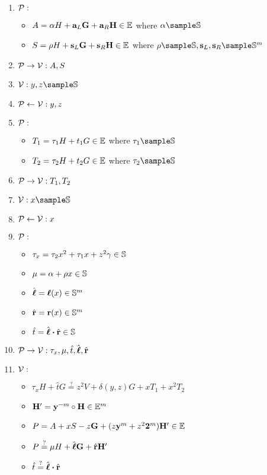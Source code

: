 \begin{enumerate}
    \item $\mathcal{P}:$
        \begin{itemize}
            \item $A = \alpha H + \mathbf{a}_L\mathbf{G} + \mathbf{a}_R\mathbf{H} \in \mathbb{E}$ where $\alpha \sample \scalars$
            \item $S = \rho H + \mathbf{s}_L\mathbf{G} + \mathbf{s}_R\mathbf{H} \in \mathbb{E}$
                where $\rho \sample \scalars, \vec{s}_L, \vec{s}_R \sample \scalars^m$
        \end{itemize}
    \item $\mathcal{P} \to \mathcal{V}: A, S$
    \item \hfill $\verifier: y, z \sample \scalars$
    \item \hfill $\mathcal{P} \leftarrow \mathcal{V}: y, z$
    \item $\mathcal{P}:$
        \begin{itemize}
            \item $T_1 = \tau_1 H + t_1G \in \mathbb{E}$ where $\tau_1 \sample \scalars$
            \item $T_2 = \tau_2 H + t_2G \in \mathbb{E}$ where $\tau_2 \sample \scalars$
        \end{itemize}
    \item $\mathcal{P} \to \mathcal{V}: T_1, T_2$
    \item \hfill $\verifier: x \sample \scalars$
    \item \hfill $\mathcal{P} \leftarrow \mathcal{V}: x$
    \item $\mathcal{P}:$
        \begin{itemize}
            \item $\tau_x = \tau_2x^2 + \tau_1x + z^2\gamma \in \mathbb{S}$
            \item $\mu = \alpha + \rho x \in \mathbb{S}$
            \item $\hat{\mathbf{\boldsymbol{\ell}}} = \mathbf{\boldsymbol{\ell}}(x) \in \mathbb{S}^m$
            \item $\hat{\mathbf{r}} = \mathbf{r}(x) \in \mathbb{S}^m$
            \item $\hat{t} = \hat{\mathbf{\boldsymbol{\ell}}} \boldsymbol{\cdot} \hat{\mathbf{r}} \in \mathbb{S}$
        \end{itemize}
    \item $\mathcal{P} \to \mathcal{V}: \tau_x, \mu, \hat{t}, \hat{\mathbf{\boldsymbol{\ell}}}, \hat{\mathbf{r}}$
    \item \hfill $\mathcal{V}:$
        \begin{itemize}
            \item \hfill $\tau_x H + \hat{t} G \overset{?}{=} z^2 V + \delta(y, z) G + x T_1 + x^2 T_2$
            \item \hfill $\mathbf{H}' = \mathbf{y}^{-m} \circ \mathbf{H} \in \mathbb{E}^m$
            \item \hfill $P = A + xS - z\mathbf{G} + (z \mathbf{y}^m + z^2 \mathbf{2}^m) \mathbf{H}' \in \mathbb{E}$
            \item \hfill $P \overset{?}{=} \mu H + \hat{\mathbf{\boldsymbol{\ell}}}\mathbf{G} + \hat{\mathbf{r}}\mathbf{H}'$
            \item \hfill $\hat{t} \overset{?}{=} \hat{\mathbf{\boldsymbol{\ell}}} \boldsymbol{\cdot} \hat{\mathbf{r}}$
        \end{itemize}
\end{enumerate}

